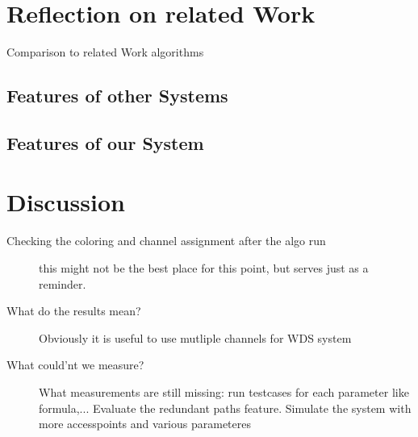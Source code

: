 \section{Reflection on related Work}
  Comparison to related Work algorithms\newline
  \subsection{Features of other Systems}
  \subsection{Features of our System}
\section{Discussion}
  \begin{description}
   \item [Checking the coloring and channel assignment after the algo run]
   this might not be the best place for this point, but serves just as a reminder.
   \item [What do the results mean?]
   Obviously it is useful to use mutliple channels for WDS system
   \item[What could'nt we measure?]
   What measurements are still missing:  run testcases for each parameter like formula,...
   Evaluate the redundant paths feature.
   Simulate the system with more accesspoints and various parameteres
  \end{description}